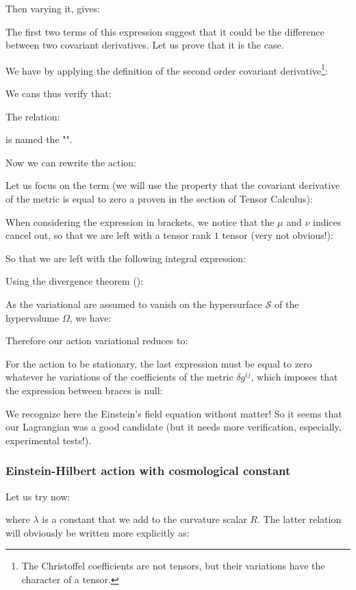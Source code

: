 \begin{itemize}
	Then varying it, gives:
	
	The first two terms of this expression suggest that it could be the difference between two covariant derivatives. Let us prove that it is the case.
	
	We have by applying the definition of the second order covariant derivative\footnote{The Christoffel coefficients are not tensors, but their variations have the character of a tensor.}:
	
	We cans thus verify that:
	
	The relation:
	
	is named the "".
	\end{itemize}
	Now we can rewrite the action:
	
	Let us focus on the term (we will use the property that the covariant derivative of the metric is equal to zero a proven in the section of Tensor Calculus):
	
	When considering the expression in brackets, we notice that the $\mu$ and $\nu$ indices cancel out, so that we are left with a tensor rank $1$ tensor (very not obvious!):
	
	So that we are left with the following integral expression:
	
	Using the divergence theorem ():
	
	As the variational are assumed to vanish on the hypersurface $\mathcal{S}$ of the hypervolume $\Omega$, we have:
	
	Therefore our action variational reduces to:
	
	For the action to be stationary, the last expression must be equal to zero whatever he variations of the coefficients of the metric $\delta g^{ij}$, which imposes that the expression between braces is null:
	
	We recognize here the Einstein's field equation without matter! So it seems that our Lagrangian was a good candidate (but it needs more verification, especially, experimental tests!).
	
	\subsubsection{Einstein-Hilbert action with cosmological constant}
	Let us try now:
	
	where $\lambda$ is a constant that we add to the curvature scalar $R$. The latter relation will obviously be written more explicitly as:
	
